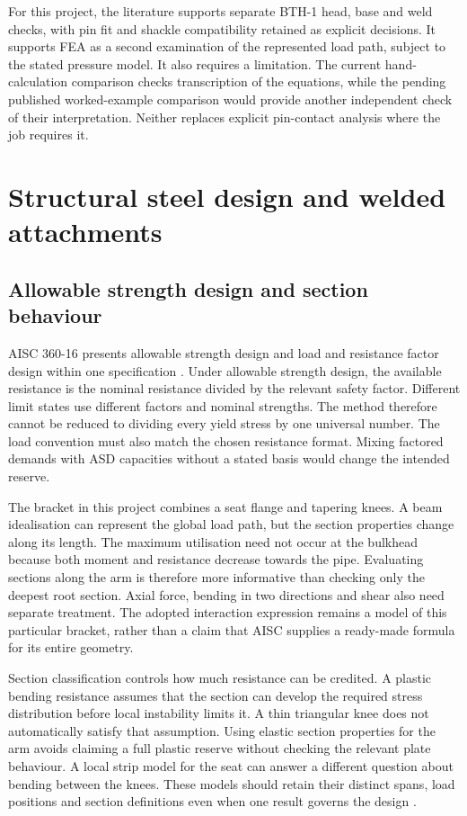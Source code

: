 For this project, the literature supports separate BTH-1 head, base and weld checks, with pin fit and shackle compatibility retained as explicit decisions. It supports FEA as a second examination of the represented load path, subject to the stated pressure model. It also requires a limitation. The current hand-calculation comparison checks transcription of the equations, while the pending published worked-example comparison would provide another independent check of their interpretation. Neither replaces explicit pin-contact analysis where the job requires it.

\section{Structural steel design and welded attachments}
\label{sec:lit-steel-welds}

\subsection{Allowable strength design and section behaviour}
\label{sec:lit-asd}

AISC 360-16 presents allowable strength design and load and resistance factor design within one specification \cite{aisc2016}. Under allowable strength design, the available resistance is the nominal resistance divided by the relevant safety factor. Different limit states use different factors and nominal strengths. The method therefore cannot be reduced to dividing every yield stress by one universal number. The load convention must also match the chosen resistance format. Mixing factored demands with ASD capacities without a stated basis would change the intended reserve.

The bracket in this project combines a seat flange and tapering knees. A beam idealisation can represent the global load path, but the section properties change along its length. The maximum utilisation need not occur at the bulkhead because both moment and resistance decrease towards the pipe. Evaluating sections along the arm is therefore more informative than checking only the deepest root section. Axial force, bending in two directions and shear also need separate treatment. The adopted interaction expression remains a model of this particular bracket, rather than a claim that AISC supplies a ready-made formula for its entire geometry.

Section classification controls how much resistance can be credited. A plastic bending resistance assumes that the section can develop the required stress distribution before local instability limits it. A thin triangular knee does not automatically satisfy that assumption. Using elastic section properties for the arm avoids claiming a full plastic reserve without checking the relevant plate behaviour. A local strip model for the seat can answer a different question about bending between the knees. These models should retain their distinct spans, load positions and section definitions even when one result governs the design \cite{aisc2016}.

